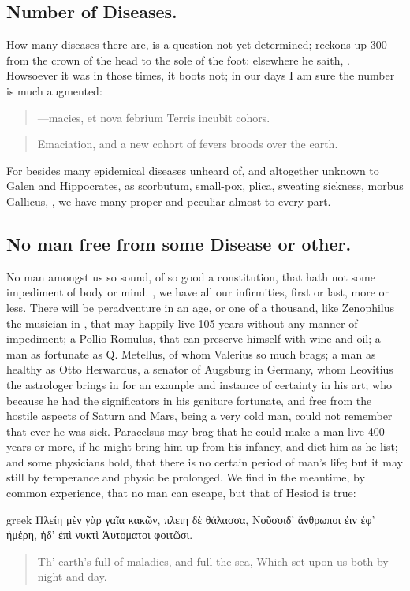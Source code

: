 {\subsection{Number of Diseases.}
How many diseases there are, is a question not yet determined;
\Pliny{} reckons up 300 from the crown of the head to the sole
of the foot: elsewhere he saith, . Howsoever it was in those times, it boots not; in our days
I am sure the number is much augmented:
%
\begin{latin}
\begin{quote}
---macies, et nova febrium
Terris incubit cohors.
\end{quote}
\end{latin}
\translationrule
\begin{quote}%
Emaciation, and a new cohort of fevers broods over the earth.
\end{quote}

For besides many epidemical diseases unheard of, and altogether unknown
to Galen and Hippocrates, as scorbutum, small-pox, plica, sweating
sickness, morbus Gallicus, \etc{}, we have many proper and peculiar almost
to every part.

\subsection{No man free from some Disease or other.}
No man amongst us so sound, of so good a constitution, that hath not some impediment of body or
mind. , we have all our infirmities, first or
last, more or less. There will be peradventure in an age, or one of a
thousand, like Zenophilus the musician in \Pliny{}, that may happily
live 105 years without any manner of impediment; a Pollio Romulus, that
can preserve himself with wine and oil; a man as fortunate as Q.
Metellus, of whom Valerius so much brags; a man as healthy as Otto
Herwardus, a senator of Augsburg in Germany, whom Leovitius the
astrologer brings in for an example and instance of certainty in his
art; who because he had the significators in his geniture fortunate,
and free from the hostile aspects of Saturn and Mars, being a very cold
man, could not remember that ever he was sick. Paracelsus may
brag that he could make a man live 400 years or more, if he might bring
him up from his infancy, and diet him as he list; and some physicians
hold, that there is no certain period of man's life; but it may still
by temperance and physic be prolonged. We find in the meantime, by
common experience, that no man can escape, but that of Hesiod is
true:
%
\begin{foreigndisplayquote}{greek}%
Πλείη μὲν γὰρ γαῖα κακῶν, πλειη δὲ θάλασσα,
Νοῦσοιδ' ἄνθρωποι ἐιν ἐφ' ἡμέρη, ἠδ' ἐπὶ νυκτὶ
Ἁυτοματοι φοιτῶσι.%
\end{foreigndisplayquote}%
\translationrule%
\begin{quote}%
Th' earth's full of maladies, and full the sea,
Which set upon us both by night and day.
\end{quote}%

}
